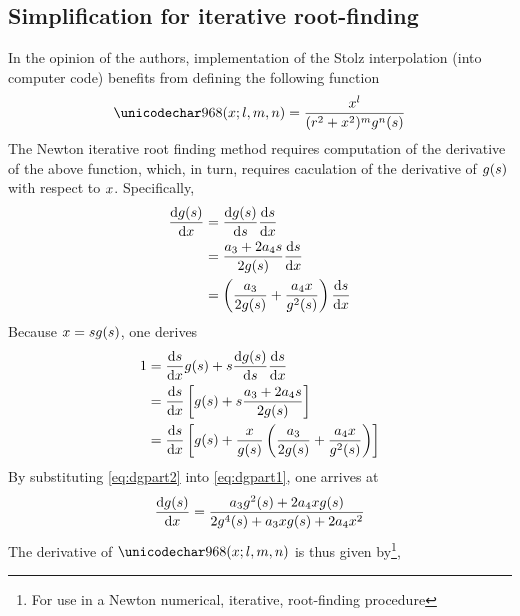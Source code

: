 \subsection{Simplification for iterative root-finding}
In the opinion of the authors, implementation of the Stolz interpolation (into computer code) benefits from defining the following function
\begin{equation}
 \shelp{l}{m}{n} = \frac{\xang^l}{(\targetrange^2+\xang^2)^m\gfunc^n(\parm)}
\end{equation}
The Newton iterative root finding method requires computation of the derivative of the above function, which, in turn, requires caculation of the derivative of $g(s)$ with respect to $x$. Specifically,
\begin{equation}
\begin{split}
 \frac{\d\gfunc(\parm)}{\d\xang} &= \frac{\d\gfunc(\parm)}{\d\parm}\frac{\d\parm}{\d\xang}\\
 &=\frac{\rcoeff_3+2\rcoeff_4\parm}{2\gfunc(\parm)}\frac{\d\parm}{\d\xang}\\
 &=\left(\frac{\rcoeff_3}{2\gfunc(\parm)}+\frac{\rcoeff_4\xang}{\gfunc^2(\parm)}\right)\frac{\d\parm}{\d\xang}
\end{split}
\label{eq:dgpart1}
\end{equation}
Because $x=sg(s)$, one derives
\begin{equation}
\begin{split}
 1 &= \frac{\d\parm}{\d\xang}\gfunc(\xparm) + \parm\frac{\d\gfunc(\parm)}{\d\parm}\frac{\d\parm}{\d\xang}\\
 & = \frac{\d\parm}{\d\xang}\left[\gfunc(\xparm) + \parm\frac{\rcoeff_3+2\rcoeff_4\parm}{2\gfunc(\parm)}\right]\\
 & = \frac{\d\parm}{\d\xang}\left[\gfunc(\xparm) + \frac{\xang}{\gfunc(\parm)}\left(\frac{\rcoeff_3}{2\gfunc(\parm)} + \frac{\rcoeff_4\xang}{\gfunc^2(\parm)}\right)\right]\\
\end{split}
\label{eq:dgpart2}
\end{equation}
By substituting \eqref{eq:dgpart2} into \eqref{eq:dgpart1}, one arrives at
\begin{equation}
 \frac{\text{d}g(s)}{\text{d}x} = \frac{a_3g^2(s) + 2a_4xg(s)}{2g^4(s) + a_3xg(s) + 2a_4x^2}
\end{equation}
The derivative of $\shelp{l}{m}{n}$ is thus given by\footnote{For use in a Newton numerical, iterative, root-finding procedure},
